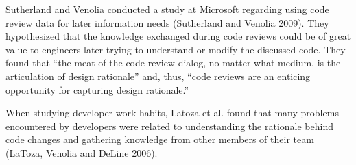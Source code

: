 Sutherland and Venolia conducted a study at Microsoft regarding using code
review data for later information needs (Sutherland and Venolia 2009). They
hypothesized that the knowledge exchanged during code reviews could be of great
value to engineers later trying to understand or modify the discussed code.
They found that ``the meat of the code review dialog, no matter what medium, is
the articulation of design rationale'' and, thus, ``code reviews are an enticing
opportunity for capturing design rationale.''

When studying developer work habits, Latoza et al. found that many problems
encountered by developers were related to understanding the rationale behind
code changes and gathering knowledge from other members of their team (LaToza,
Venolia and DeLine 2006).
